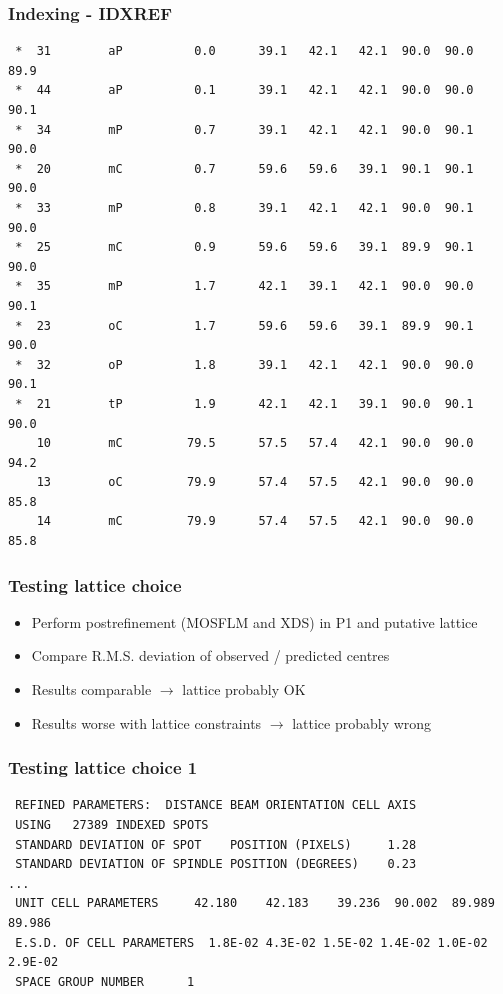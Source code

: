 \documentclass[slides,compress]{beamer}
\begin{document}
\begin{frame}[fragile]
\frametitle{Indexing - IDXREF}
{\small
\begin{verbatim}
 *  31        aP          0.0      39.1   42.1   42.1  90.0  90.0  89.9
 *  44        aP          0.1      39.1   42.1   42.1  90.0  90.0  90.1
 *  34        mP          0.7      39.1   42.1   42.1  90.0  90.1  90.0
 *  20        mC          0.7      59.6   59.6   39.1  90.1  90.1  90.0
 *  33        mP          0.8      39.1   42.1   42.1  90.0  90.1  90.0
 *  25        mC          0.9      59.6   59.6   39.1  89.9  90.1  90.0
 *  35        mP          1.7      42.1   39.1   42.1  90.0  90.0  90.1
 *  23        oC          1.7      59.6   59.6   39.1  89.9  90.1  90.0
 *  32        oP          1.8      39.1   42.1   42.1  90.0  90.0  90.1
 *  21        tP          1.9      42.1   42.1   39.1  90.0  90.1  90.0
    10        mC         79.5      57.5   57.4   42.1  90.0  90.0  94.2
    13        oC         79.9      57.4   57.5   42.1  90.0  90.0  85.8
    14        mC         79.9      57.4   57.5   42.1  90.0  90.0  85.8
\end{verbatim}
}
\end{frame}

\begin{frame}
\frametitle{Testing lattice choice}
\begin{itemize}
\item{Perform postrefinement (MOSFLM and XDS) in P1 and putative lattice}
\item{Compare R.M.S. deviation of observed / predicted centres}
\item{Results comparable $\rightarrow$ lattice probably OK}
\item{Results worse with lattice constraints $\rightarrow$ lattice probably
wrong}
\end{itemize}
\end{frame}

\begin{frame}[fragile]
\frametitle{Testing lattice choice 1}
{\small
\begin{verbatim}
 REFINED PARAMETERS:  DISTANCE BEAM ORIENTATION CELL AXIS                   
 USING   27389 INDEXED SPOTS
 STANDARD DEVIATION OF SPOT    POSITION (PIXELS)     1.28
 STANDARD DEVIATION OF SPINDLE POSITION (DEGREES)    0.23
...
 UNIT CELL PARAMETERS     42.180    42.183    39.236  90.002  89.989  89.986
 E.S.D. OF CELL PARAMETERS  1.8E-02 4.3E-02 1.5E-02 1.4E-02 1.0E-02 2.9E-02
 SPACE GROUP NUMBER      1
\end{verbatim}
}
\end{frame}
\end{document}

